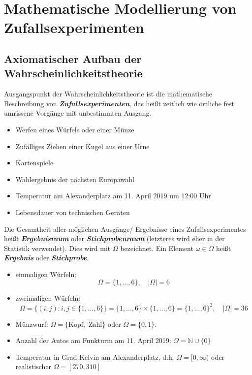 \documentclass[a4paper, landscape,twocolumn,fontsize=9pt]{scrartcl}
\newcommand{\vip}[1]{\textit{\textbf{#1}}}
\begin{document}
\section{Mathematische Modellierung von Zufallsexperimenten}

\subsection{Axiomatischer Aufbau der Wahrscheinlichkeitstheorie}
Ausgangspunkt der Wahrscheinlichkeitstheorie ist die mathematische Beschreibung von \vip{Zufallsexperimenten}, das heißt zeitlich wie örtliche fest umrissene Vorgänge mit unbestimmten Ausgang.

\begin{example}{}{}
\begin{itemize}
	\item Werfen eines Würfels oder einer Münze
	\item Zufälliges Ziehen einer Kugel aus einer Urne
	\item Kartenspiele
	\item Wahlergebnis der nächsten Europawahl
	\item Temperatur am Alexanderplatz am 11. April 2019 um 12:00 Uhr
	\item Lebensdauer von technischen Geräten
\end{itemize}	
\end{example}

Die Gesamtheit aller möglichen Ausgänge/ Ergebnisse eines Zufallsexperimentes heißt \vip{Ergebnisraum} oder \vip{Stichprobenraum} (letzteres wird eher in der Statistik verwendet). Dies wird mit $\Omega$ bezeichnet. Ein Element $\omega \in \Omega$ heißt \vip{Ergebnis} oder \vip{Stichprobe}. 

\begin{example}{}{}
	\begin{itemize}
		\item einmaligen Würfeln: 
		\[
			\Omega = \{ 1,..., 6 \}, \quad |\Omega| = 6
		\]
		
		\item zweimaligen Würfeln:
		\[
			\Omega = \{ (i,j) : i,j \in \{ 1,...,6 \} \} = \{1,...,6\} \times \{1,...,6 \} = \{ 1,...,6 \}^2, \quad |\Omega| = 36
		\]
		
		\item Münzwurf: $\Omega = \{ \text{Kopf}, \text{ Zahl}\}$ oder $\Omega = \{ 0,1 \}$.
		\item Anzahl der Autos am Funkturm am 11. April 2019: $\Omega = \mathbb N \cup \{ 0 \}$
		
		\item Temperatur in Grad Kelvin am Alexanderplatz, d.h. $\Omega = [0,\infty)$ oder realistischer $\Omega = [270, 310]$

	\end{itemize}	
\end{example}
\end{document}

